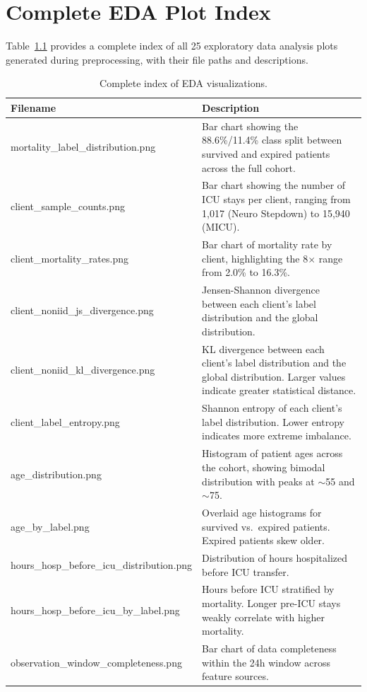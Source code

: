 \documentclass[11pt,a4paper]{report}
\begin{document}
\chapter{Complete EDA Plot Index}

Table~\ref{tab:eda_index_full} provides a complete index of all 25 exploratory data analysis plots generated during preprocessing, with their file paths and descriptions.

\begin{longtable}{p{6cm}p{8cm}}
\caption{Complete index of EDA visualizations.} \label{tab:eda_index_full} \\
\toprule
\textbf{Filename} & \textbf{Description} \\
\midrule
\endhead
mortality\_label\_distribution.png & Bar chart showing the 88.6\%/11.4\% class split between survived and expired patients across the full cohort. \\
client\_sample\_counts.png & Bar chart showing the number of ICU stays per client, ranging from 1,017 (Neuro Stepdown) to 15,940 (MICU). \\
client\_mortality\_rates.png & Bar chart of mortality rate by client, highlighting the 8$\times$ range from 2.0\% to 16.3\%. \\
client\_noniid\_js\_divergence.png & Jensen-Shannon divergence between each client's label distribution and the global distribution. \\
client\_noniid\_kl\_divergence.png & KL divergence between each client's label distribution and the global distribution. Larger values indicate greater statistical distance. \\
client\_label\_entropy.png & Shannon entropy of each client's label distribution. Lower entropy indicates more extreme imbalance. \\
age\_distribution.png & Histogram of patient ages across the cohort, showing bimodal distribution with peaks at $\sim$55 and $\sim$75. \\
age\_by\_label.png & Overlaid age histograms for survived vs.\ expired patients. Expired patients skew older. \\
hours\_hosp\_before\_icu\_distribution.png & Distribution of hours hospitalized before ICU transfer. \\
hours\_hosp\_before\_icu\_by\_label.png & Hours before ICU stratified by mortality. Longer pre-ICU stays weakly correlate with higher mortality. \\
observation\_window\_completeness.png & Bar chart of data completeness within the 24h window across feature sources. \\

\end{longtable}
\end{document}

